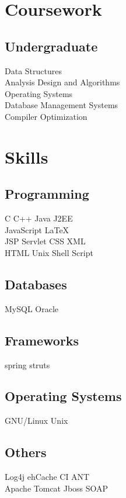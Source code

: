 \documentclass[]{prashant-resume-openfont}
\begin{document}
\begin{minipage}[t]{0.33\textwidth}

\section{Coursework}
\subsection{Undergraduate}
Data Structures \\
Analysis Design and Algorithms \\
Operating Systems \\
Database Management Systems \\
Compiler Optimization \\
\sectionsep


\section{Skills}
\subsection{Programming}
C \textbullet{}   C++ \textbullet{} Java \textbullet{} J2EE \\
JavaScript \textbullet{} \LaTeX\ \\ 
JSP \textbullet{} Servlet \textbullet{} CSS \textbullet{} XML\\
HTML \textbullet{} Unix \textbullet{} Shell Script \\
\sectionsep
\subsection{Databases}
MySQL \textbullet{}   Oracle \\
\sectionsep 

\subsection{Frameworks}
spring \textbullet{} struts
\sectionsep
\subsection{Operating Systems}
GNU/Linux \textbullet{}   Unix 
\sectionsep

\subsection{Others}
Log4j \textbullet{}ehCache \textbullet{}CI \textbullet{}ANT\\
Apache Tomcat \textbullet{} Jboss \textbullet{} SOAP
\sectionsep

%
%

\end{minipage} 
\end{document}
